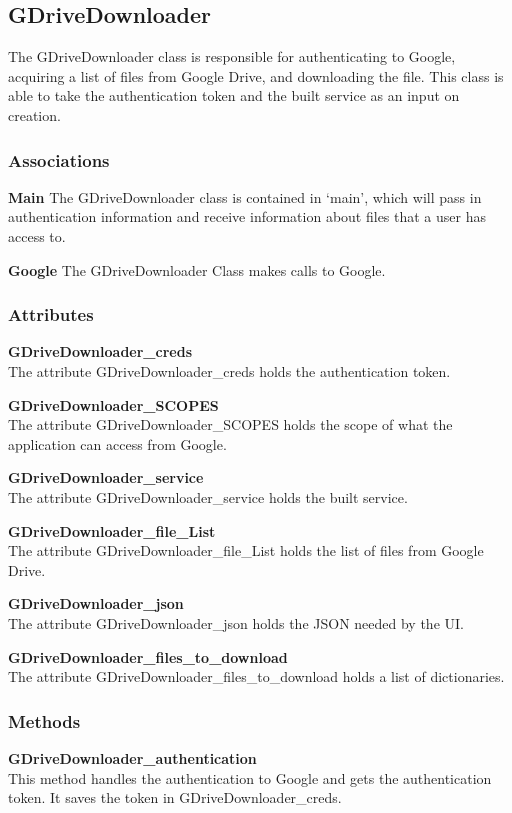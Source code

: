 \subsection{GDriveDownloader}
The GDriveDownloader class is responsible for authenticating to Google, acquiring a list of files from Google Drive, and downloading the file.
This class is able to take the authentication token and the built service as an input on creation.  
\subsubsection{Associations}
\textbf{Main} 
The GDriveDownloader class is contained in `main', which will pass in authentication information and receive information about files 
that a user has access to.

\textbf{Google} 
The GDriveDownloader Class makes calls to Google.

\subsubsection{Attributes}

\textbf{GDriveDownloader\_creds} \\
The attribute GDriveDownloader\_creds holds the authentication token.

\textbf{GDriveDownloader\_SCOPES} \\
The attribute GDriveDownloader\_SCOPES holds the scope of what the application can access from Google.

\textbf{GDriveDownloader\_service} \\
The attribute GDriveDownloader\_service holds the built service.

\textbf{GDriveDownloader\_file\_List} \\
The attribute GDriveDownloader\_file\_List holds the list of files from Google Drive.

\textbf{GDriveDownloader\_json} \\
The attribute GDriveDownloader\_json holds the JSON needed by the UI.

\textbf{GDriveDownloader\_files\_to\_download} \\
The attribute GDriveDownloader\_files\_to\_download holds a list of dictionaries.

\subsubsection{Methods}
\textbf{GDriveDownloader\_authentication} \\
This method handles the authentication to Google and gets the authentication token. It saves the token in GDriveDownloader\_creds.

